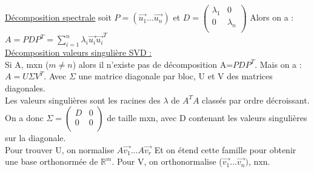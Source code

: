 \documentclass[../main.tex]{subfiles}
\begin{document}
\quad \underline{Décomposition spectrale}
soit $P = (\vec{u_1} \dots \vec{u_n})$ et $D = \begin{pmatrix}
    \lambda_1 &0\\
    0& \lambda_n\\
\end{pmatrix}$ Alors on a : $A=PDP^T = \sum_{i=1}^n \lambda_i \vec{u_i}\vec{u_i}^T$\\


\quad \underline{Décomposition valeurs singulière SVD :}\\
Si A, mxn ($m\neq n$) alors il n'existe pas de décomposition A=$PDP^T$. Mais on a : $A = U\Sigma V^T$. Avec $\Sigma$ une matrice diagonale par bloc, U et V des matrices diagonales. \\

Les valeurs singulières sont les racines des $\lambda$ de $A^TA$ classés par ordre décroissant. \\
On a donc $\Sigma = \begin{pmatrix}
    D & 0\\
    0 & 0\\
\end{pmatrix}$ de taille mxn, avec D contenant les valeurs singulières sur la diagonale.\\
Pour trouver U, on normalise {$A\vec{v_1} \dots A\vec{v_r}$} Et on étend cette famille pour obtenir une base orthonormée de $\mathbb{R}^m$. Pour V, on orthonormalise ($\vec{v_1}\dots \vec{v_n})$, nxn.
\end{document}
